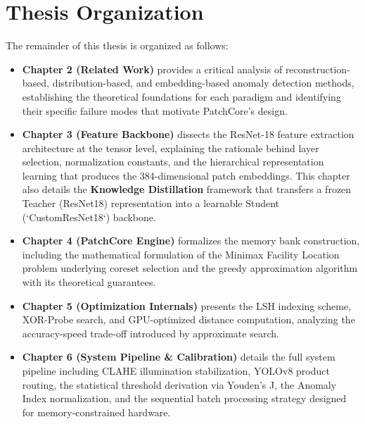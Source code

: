 \documentclass[12pt,a4paper,oneside]{report}
\begin{document}
\section{Thesis Organization}

The remainder of this thesis is organized as follows:

\begin{itemize}
  \item \textbf{Chapter 2 (Related Work)} provides a critical analysis of reconstruction-based, distribution-based, and embedding-based anomaly detection methods, establishing the theoretical foundations for each paradigm and identifying their specific failure modes that motivate PatchCore's design.
\end{itemize}
\begin{itemize}
  \item \textbf{Chapter 3 (Feature Backbone)} dissects the ResNet-18 feature extraction architecture at the tensor level, explaining the rationale behind layer selection, normalization constants, and the hierarchical representation learning that produces the 384-dimensional patch embeddings. This chapter also details the \textbf{Knowledge Distillation} framework that transfers a frozen Teacher (ResNet18) representation into a learnable Student (`CustomResNet18`) backbone.
\end{itemize}
\begin{itemize}
  \item \textbf{Chapter 4 (PatchCore Engine)} formalizes the memory bank construction, including the mathematical formulation of the Minimax Facility Location problem underlying coreset selection and the greedy approximation algorithm with its theoretical guarantees.
\end{itemize}
\begin{itemize}
  \item \textbf{Chapter 5 (Optimization Internals)} presents the LSH indexing scheme, XOR-Probe search, and GPU-optimized distance computation, analyzing the accuracy-speed trade-off introduced by approximate search.
\end{itemize}
\begin{itemize}
  \item \textbf{Chapter 6 (System Pipeline & Calibration)} details the full system pipeline including CLAHE illumination stabilization, YOLOv8 product routing, the statistical threshold derivation via Youden's J, the Anomaly Index normalization, and the sequential batch processing strategy designed for memory-constrained hardware.
\end{itemize}
\end{document}
